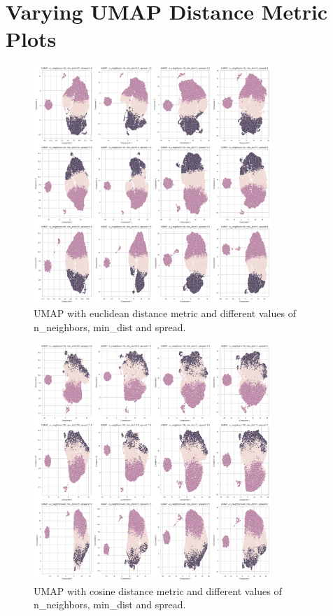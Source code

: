 \documentclass{article}
\begin{document}
\section{Varying UMAP Distance Metric Plots}
\begin{figure}[H]
    \centering
    \includegraphics[width=0.8\textwidth]{figures/output.png}
    \caption{UMAP with euclidean distance metric and different values of n\_neighbors, min\_dist and spread.}
    \label{fig:umap}
\end{figure}
\begin{figure}[H]
    \centering
    \includegraphics[width=0.8\textwidth]{figures/output1.png}
    \caption{UMAP with cosine distance metric and different values of n\_neighbors, min\_dist and spread.}
    \label{fig:umap1}
\end{figure}
\end{document}
